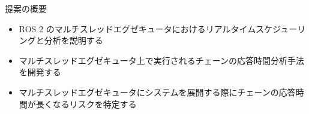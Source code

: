 
\begin{frame}{提案の概要}
    \begin{itemize}
        \item ROS 2 のマルチスレッドエグゼキュータにおけるリアルタイムスケジューリングと分析を説明する
        \item マルチスレッドエグゼキュータ上で実行されるチェーンの応答時間分析手法を開発する
        \item マルチスレッドエグゼキュータにシステムを展開する際にチェーンの応答時間が長くなるリスクを特定する
    \end{itemize}
\end{frame}
